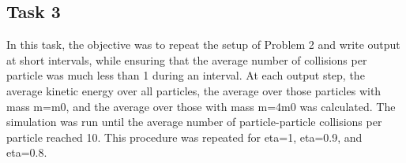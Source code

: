 \subsection{Task 3}

In this task, the objective was to repeat the setup of Problem 2 
and write output at short intervals, while ensuring that the 
average number of collisions per particle was much less than
 1 during an interval. At each output step, the average kinetic
  energy over all particles, the average over those particles with 
  mass m=m0, and the average over those with mass m=4m0 
  was calculated. The simulation was run until the average 
  number of particle-particle collisions per particle reached 10. 
  This procedure was repeated for eta=1, eta=0.9, and eta=0.8. 


